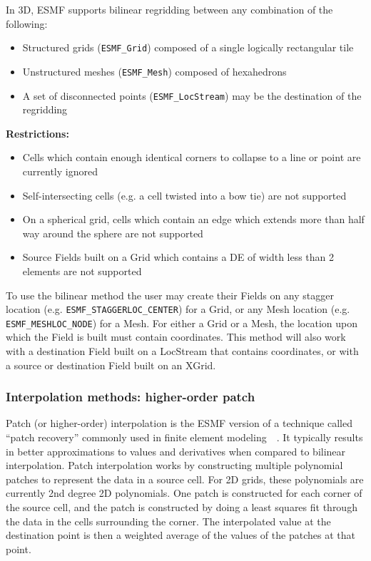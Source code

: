 \smallskip

 In 3D, ESMF supports bilinear regridding between any combination of the following:
 \begin{itemize}
 \item Structured grids ({\tt ESMF\_Grid}) composed of a single logically rectangular tile
 \item Unstructured meshes ({\tt ESMF\_Mesh}) composed of hexahedrons 
 \item A set of disconnected points ({\tt ESMF\_LocStream}) may be the destination of the regridding
 \end{itemize}

\smallskip

{\bf Restrictions:}
 \begin{itemize}
 \item Cells which contain enough identical corners to collapse to a line or point are currently ignored
 \item Self-intersecting cells (e.g. a cell twisted into a bow tie) are not supported 
 \item On a spherical grid, cells which contain an edge which extends more than half way around the sphere are not supported 
 \item Source Fields built on a Grid which contains a DE of width less than 2 elements are not supported
 \end{itemize}

 To use the bilinear method the user may create their Fields on any stagger location (e.g. {\tt ESMF\_STAGGERLOC\_CENTER}) for a Grid, or
 any Mesh location (e.g. {\tt ESMF\_MESHLOC\_NODE}) for a Mesh. For either a Grid or a Mesh, the location upon which the Field is built 
 must contain coordinates. This method will also work with a destination Field built on a LocStream that contains coordinates, 
 or with a source or destination Field built on an XGrid.

\subsubsection{Interpolation methods: higher-order patch}\label{sec:interpolation:patch}

 Patch (or higher-order) interpolation is the ESMF version of a technique called ``patch recovery'' commonly
 used in finite element modeling~\cite{PatchInterp1}~\cite{PatchInterp2}. It typically results in better approximations to 
 values and derivatives when compared to bilinear interpolation.
 Patch interpolation works by constructing multiple polynomial patches to represent
 the data in a source cell. For 2D grids, these polynomials
 are currently 2nd degree 2D polynomials. One patch is constructed for each corner of the source cell, and the patch is constructed 
 by doing a least squares fit through the data in the cells surrounding the corner. The interpolated value at the destination point is 
 then a weighted average of the values of the patches at that point. 

